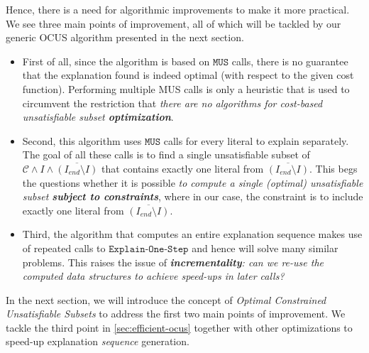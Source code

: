 \documentclass[twoside,11pt]{article}
\newcommand\m[1]{\mathcal{#1}}
\newcommand\comment[1]{\marginpar{\tiny #1}}
\renewcommand\comment[1]{#1}
\newcommand{\bart}[1]{{\comment{\color{OliveGreen}Bart: #1}}}
\newcommand\Iend{\ensuremath{I_\mathit{end} }\xspace}
\newcommand\formulac{\ensuremath{\m{C} }\xspace}
\newcommand\mm[1]{\ensuremath{#1}\xspace}
\newcommand\call[1]{\mm{\texttt{#1}}}
\newcommand\onestep{\ensuremath{\call{Explain-One-Step}}\xspace}
\begin{document}
Hence, there is a need for algorithmic improvements to make it more practical.
We see three main points of improvement, all of which will be tackled by our generic OCUS algorithm presented in the next section. 

\begin{itemize}
	
\item First of all, since the algorithm is based on \call{MUS} calls, there is no guarantee that the explanation found is indeed optimal (with respect to the given cost function). Performing multiple MUS calls  is only a heuristic that is used to circumvent the restriction that \textit{there are no algorithms for cost-based unsatisfiable subset \textbf{optimization}}. 

\item Second, this algorithm uses \call{MUS} calls for every literal to explain separately. The goal of all these calls is to find a single unsatisfiable subset of $\formulac \land I \land \overline{(\Iend\setminus I)}$ that contains exactly one literal from $\overline{(\Iend\setminus I)}$. This begs the questions whether it is possible \textit{to compute a single (optimal) unsatisfiable subset \textbf{subject to constraints}}, where in our case, the constraint is to include exactly one literal from $\overline{(\Iend\setminus I)}$. 

\item Third, the algorithm that computes an entire explanation sequence makes use of repeated calls to \onestep and hence will solve many similar problems. This raises the issue of \textit{\textbf{incrementality}: can we re-use the computed data structures to achieve speed-ups in later calls?}

\end{itemize}


In the next section, we will introduce the concept of \emph{Optimal Constrained Unsatisfiable Subsets} to address the first two main points of improvement. We tackle the third point in \cref{sec:efficient-ocus} together with other optimizations to speed-up explanation \emph{sequence} generation. %
\end{document}
